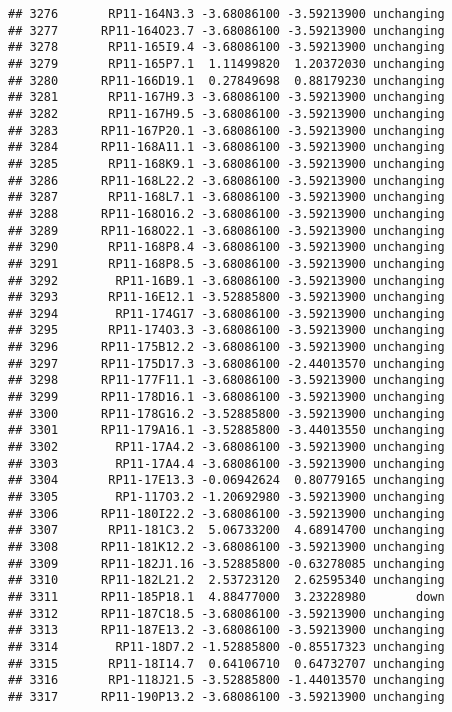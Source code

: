 \documentclass[]{article}
\begin{document}
\begin{verbatim}
## 3276       RP11-164N3.3 -3.68086100 -3.59213900 unchanging
## 3277      RP11-164O23.7 -3.68086100 -3.59213900 unchanging
## 3278       RP11-165I9.4 -3.68086100 -3.59213900 unchanging
## 3279       RP11-165P7.1  1.11499820  1.20372030 unchanging
## 3280      RP11-166D19.1  0.27849698  0.88179230 unchanging
## 3281       RP11-167H9.3 -3.68086100 -3.59213900 unchanging
## 3282       RP11-167H9.5 -3.68086100 -3.59213900 unchanging
## 3283      RP11-167P20.1 -3.68086100 -3.59213900 unchanging
## 3284      RP11-168A11.1 -3.68086100 -3.59213900 unchanging
## 3285       RP11-168K9.1 -3.68086100 -3.59213900 unchanging
## 3286      RP11-168L22.2 -3.68086100 -3.59213900 unchanging
## 3287       RP11-168L7.1 -3.68086100 -3.59213900 unchanging
## 3288      RP11-168O16.2 -3.68086100 -3.59213900 unchanging
## 3289      RP11-168O22.1 -3.68086100 -3.59213900 unchanging
## 3290       RP11-168P8.4 -3.68086100 -3.59213900 unchanging
## 3291       RP11-168P8.5 -3.68086100 -3.59213900 unchanging
## 3292        RP11-16B9.1 -3.68086100 -3.59213900 unchanging
## 3293       RP11-16E12.1 -3.52885800 -3.59213900 unchanging
## 3294        RP11-174G17 -3.68086100 -3.59213900 unchanging
## 3295       RP11-174O3.3 -3.68086100 -3.59213900 unchanging
## 3296      RP11-175B12.2 -3.68086100 -3.59213900 unchanging
## 3297      RP11-175D17.3 -3.68086100 -2.44013570 unchanging
## 3298      RP11-177F11.1 -3.68086100 -3.59213900 unchanging
## 3299      RP11-178D16.1 -3.68086100 -3.59213900 unchanging
## 3300      RP11-178G16.2 -3.52885800 -3.59213900 unchanging
## 3301      RP11-179A16.1 -3.52885800 -3.44013550 unchanging
## 3302        RP11-17A4.2 -3.68086100 -3.59213900 unchanging
## 3303        RP11-17A4.4 -3.68086100 -3.59213900 unchanging
## 3304       RP11-17E13.3 -0.06942624  0.80779165 unchanging
## 3305        RP1-117O3.2 -1.20692980 -3.59213900 unchanging
## 3306      RP11-180I22.2 -3.68086100 -3.59213900 unchanging
## 3307       RP11-181C3.2  5.06733200  4.68914700 unchanging
## 3308      RP11-181K12.2 -3.68086100 -3.59213900 unchanging
## 3309      RP11-182J1.16 -3.52885800 -0.63278085 unchanging
## 3310      RP11-182L21.2  2.53723120  2.62595340 unchanging
## 3311      RP11-185P18.1  4.88477000  3.23228980       down
## 3312      RP11-187C18.5 -3.68086100 -3.59213900 unchanging
## 3313      RP11-187E13.2 -3.68086100 -3.59213900 unchanging
## 3314        RP11-18D7.2 -1.52885800 -0.85517323 unchanging
## 3315       RP11-18I14.7  0.64106710  0.64732707 unchanging
## 3316       RP1-118J21.5 -3.52885800 -1.44013570 unchanging
## 3317      RP11-190P13.2 -3.68086100 -3.59213900 unchanging

\end{verbatim}
\end{document}
